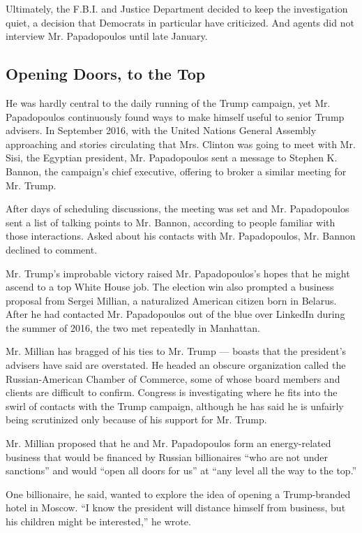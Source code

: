 Ultimately, the F.B.I. and Justice Department decided to keep the
investigation quiet, a decision that Democrats in particular have
criticized. And agents did not interview Mr. Papadopoulos until late
January.

\hypertarget{opening-doors-to-the-top}{%
\subsection{Opening Doors, to the Top}\label{opening-doors-to-the-top}}

He was hardly central to the daily running of the Trump campaign, yet
Mr. Papadopoulos continuously found ways to make himself useful to
senior Trump advisers. In September 2016, with the United Nations
General Assembly approaching and stories circulating that Mrs. Clinton
was going to meet with Mr. Sisi, the Egyptian president, Mr.
Papadopoulos sent a message to Stephen K. Bannon, the campaign's chief
executive, offering to broker a similar meeting for Mr. Trump.

After days of scheduling discussions, the meeting was set and Mr.
Papadopoulos sent a list of talking points to Mr. Bannon, according to
people familiar with those interactions. Asked about his contacts with
Mr. Papadopoulos, Mr. Bannon declined to comment.

Mr. Trump's improbable victory raised Mr. Papadopoulos's hopes that he
might ascend to a top White House job. The election win also prompted a
business proposal from Sergei Millian, a naturalized American citizen
born in Belarus. After he had contacted Mr. Papadopoulos out of the blue
over LinkedIn during the summer of 2016, the two met repeatedly in
Manhattan.

Mr. Millian has bragged of his ties to Mr. Trump --- boasts that the
president's advisers have said are overstated. He headed an obscure
organization called the Russian-American Chamber of Commerce, some of
whose board members and clients are difficult to confirm. Congress is
investigating where he fits into the swirl of contacts with the Trump
campaign, although he has said he is unfairly being scrutinized only
because of his support for Mr. Trump.

Mr. Millian proposed that he and Mr. Papadopoulos form an energy-related
business that would be financed by Russian billionaires ``who are not
under sanctions'' and would ``open all doors for us'' at ``any level all
the way to the top.''

One billionaire, he said, wanted to explore the idea of opening a
Trump-branded hotel in Moscow. ``I know the president will distance
himself from business, but his children might be interested,'' he wrote.

